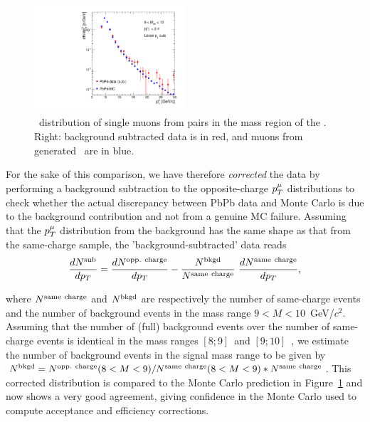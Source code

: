 \begin{figure}[h]
\begin{centering}  
 \includegraphics[width=0.5\textwidth]{Chapters/aCorrection/pt_aasub_MC.pdf}
  \caption{\pt\ distribution of single muons from pairs in the mass
    region of the \PgU. Right: background subtracted data is
    in red, and muons from generated \PgU\ are in blue.
  }
  \label{fig:datasubMC}
\end{centering}  
\end{figure}



For the sake of this comparison, we have therefore \emph{corrected} the data by performing a background subtraction to the opposite-charge $p_{T}^\mu$ distributions to check whether the actual discrepancy between PbPb data and Monte Carlo is due to the background contribution and not from a genuine MC failure. Assuming that the $p_{T}^\mu$ distribution from the background has the same shape as that from the same-charge sample, the 'background-subtracted' data reads
 \begin{equation}
\frac{dN^{\rm sub}}{d\pt} = \frac{dN^{\rm opp.\ charge}}{d\pt} - \frac{N^{\rm bkgd}}{N^{\rm same\ charge}}\ \frac{dN^{\rm same\ charge}}{d\pt},
 \end{equation}


where $N^{\rm same\ charge}$ and $N^{\rm bkgd}$ are respectively the number of same-charge events and the number of background events in the mass range $9<M<10$~GeV/$c^2$. Assuming that the number of (full) background events over the number of same-charge events is identical in the mass ranges $[8;9]$~\unitMass and $[9;10]$~\unitMass, we estimate the number of background events in the signal mass range to be given by $N^{\rm bkgd}=N^{\rm opp.\ charge}(8<M<9)/N^{\rm same\ charge}(8<M<9)*N^{\rm same\ charge}$. This corrected distribution is compared to the Monte Carlo prediction in Figure~\ref{fig:datasubMC} and now shows a very good agreement, giving confidence in the Monte Carlo used to compute acceptance and efficiency corrections.



